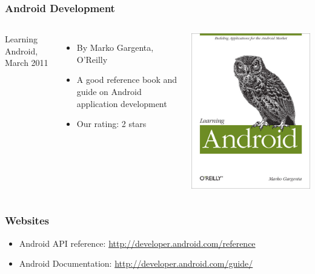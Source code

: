 \begin{frame}
  \frametitle{Android Development}
  \begin{columns}
    Learning Android, March 2011
    \begin{itemize}
    \item By Marko Gargenta, O'Reilly
    \item A good reference book and guide on Android application
      development
    \item Our rating: 2 stars
    \end{itemize}
    \includegraphics[width=\textwidth]{slides/android-resources/learning-android.jpg}
  \end{columns}
\end{frame}

\begin{frame}
  \frametitle{Websites}
  \begin{itemize}
  \item Android API reference: \url{http://developer.android.com/reference}
  \item Android Documentation: \url{http://developer.android.com/guide/}
  \end{itemize}
\end{frame}

